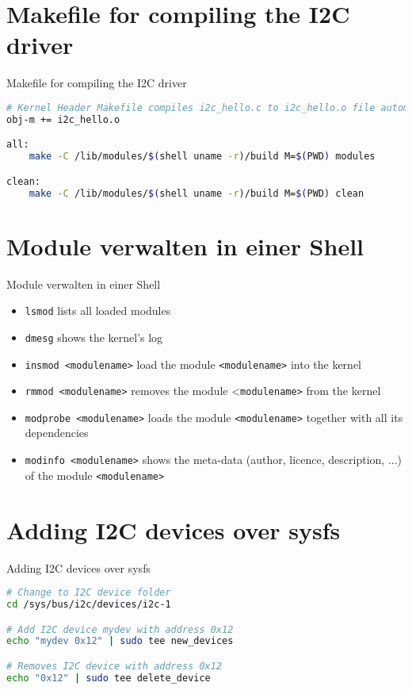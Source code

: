 \documentclass[aspectratio=169]{beamer}
\begin{document}
\section{Makefile for compiling the I2C driver}
\begin{frame}[fragile]{Makefile for compiling the I2C driver}
	\begin{lstlisting}[language=bash]
# Kernel Header Makefile compiles i2c_hello.c to i2c_hello.o file automatically
obj-m += i2c_hello.o

all:
	make -C /lib/modules/$(shell uname -r)/build M=$(PWD) modules

clean:
	make -C /lib/modules/$(shell uname -r)/build M=$(PWD) clean
	\end{lstlisting}
\end{frame}

\section{Module verwalten in einer Shell}
\begin{frame}[fragile]{Module verwalten in einer Shell}
	\begin{itemize}
		\item \lstinline|lsmod| lists all loaded modules
		\item \lstinline|dmesg| shows the kernel's log
		\item \lstinline|insmod <modulename>| load the module \lstinline|<modulename>| into the kernel
		\item \lstinline|rmmod <modulename>|  removes the module <\lstinline|modulename>| from the kernel
		\item \lstinline|modprobe <modulename>|  loads the module \lstinline|<modulename>| together with all its dependencies
		\item \lstinline|modinfo <modulename>|  shows the meta-data (author, licence, description, ...) of the module \lstinline|<modulename>|
	\end{itemize}
\end{frame}

\section{Adding I2C devices over sysfs}
\begin{frame}[fragile]{Adding I2C devices over sysfs}
	\begin{lstlisting}[language=bash]
# Change to I2C device folder
cd /sys/bus/i2c/devices/i2c-1

# Add I2C device mydev with address 0x12
echo "mydev 0x12" | sudo tee new_devices

# Removes I2C device with address 0x12
echo "0x12" | sudo tee delete_device
	\end{lstlisting}
\end{frame}
\end{document}
